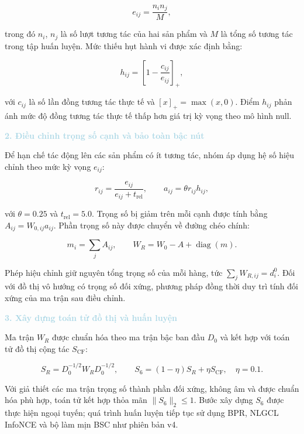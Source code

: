 \begin{equation}
e_{ij}=\frac{n_i n_j}{M},
\end{equation}

trong đó $n_i$, $n_j$ là số lượt tương tác của hai sản phẩm và $M$ là tổng số tương tác trong tập huấn luyện. Mức thiếu hụt hành vi được xác định bằng:

\begin{equation}
h_{ij}=\left[1-\frac{c_{ij}}{e_{ij}}\right]_{+},
\end{equation}

với $c_{ij}$ là số lần đồng tương tác thực tế và $[x]_{+}=\max(x,0)$. Điểm $h_{ij}$ phản ánh mức độ đồng tương tác thực tế thấp hơn giá trị kỳ vọng theo mô hình null.

\noindent\textcolor{lightblue}{\textbf{2. Điều chỉnh trọng số cạnh và bảo toàn bậc nút}}

Để hạn chế tác động lên các sản phẩm có ít tương tác, nhóm áp dụng hệ số hiệu chỉnh theo mức kỳ vọng $e_{ij}$:

\begin{equation}
r_{ij}=\frac{e_{ij}}{e_{ij}+t_{\mathrm{rel}}},
\qquad
a_{ij}=\theta r_{ij}h_{ij},
\end{equation}

với $\theta=0.25$ và $t_{\mathrm{rel}}=5.0$. Trọng số bị giảm trên mỗi cạnh được tính bằng $A_{ij}=W_{0,ij}a_{ij}$. Phần trọng số này được chuyển về đường chéo chính:

\begin{equation}
m_i=\sum_j A_{ij},
\qquad
W_R=W_0-A+\operatorname{diag}(m).
\end{equation}

Phép hiệu chỉnh giữ nguyên tổng trọng số của mỗi hàng, tức $\sum_j W_{R,ij}=d_i^0$. Đối với đồ thị vô hướng có trọng số đối xứng, phương pháp đồng thời duy trì tính đối xứng của ma trận sau điều chỉnh.

\noindent\textcolor{lightblue}{\textbf{3. Xây dựng toán tử đồ thị và huấn luyện}}

Ma trận $W_R$ được chuẩn hóa theo ma trận bậc ban đầu $D_0$ và kết hợp với toán tử đồ thị cộng tác $S_{\mathrm{CF}}$:

\begin{equation}
S_R=D_0^{-1/2}W_RD_0^{-1/2},
\qquad
S_6=(1-\eta)S_R+\eta S_{\mathrm{CF}},
\quad \eta=0.1.
\end{equation}

Với giả thiết các ma trận trọng số thành phần đối xứng, không âm và được chuẩn hóa phù hợp, toán tử kết hợp thỏa mãn $\lVert S_6\rVert_2\leq 1$. Bước xây dựng $S_6$ được thực hiện ngoại tuyến; quá trình huấn luyện tiếp tục sử dụng BPR, NLGCL InfoNCE và bộ làm mịn BSC như phiên bản v4.


